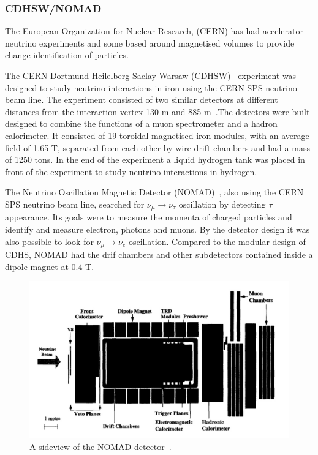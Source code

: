 \subsubsection{CDHSW/NOMAD}
The European Organization for Nuclear Research, (CERN) has had accelerator neutrino experiments and some based around magnetised volumes to provide change identification of particles. 

The CERN Dortmund Heilelberg Saclay Warsaw (CDHSW)~\cite{40CDHSW} experiment was designed to study neutrino interactions in iron using the CERN SPS neutrino beam line. The experiment consisted of two similar detectors at different distances from the interaction vertex 130 m and 885 m~\cite{40CDHSW}.The detectors were built designed to combine the functions of a muon spectrometer and a hadron calorimeter. It consisted of 19 toroidal magnetised iron modules, with an average field of 1.65 T, separated from each other by wire drift chambers and had a mass of 1250 tons. In the end of the experiment a liquid hydrogen tank was placed in front of the experiment to study neutrino interactions in hydrogen.


The Neutrino Oscillation Magnetic Detector (NOMAD)~\cite{NOMADexp}, also using the CERN SPS neutrino beam line, searched for $\nu_\mu \rightarrow \nu_\tau$ oscillation by detecting $\tau$ appearance. Its goals were to measure the momenta of charged particles and identify and measure electron, photons and muons. By the detector design it was also possible to look for $\nu_\mu \rightarrow \nu_e$ oscillation. Compared to the modular design of CDHS, NOMAD had the drif chambers and other subdetectors contained inside a dipole magnet at 0.4 T.


\begin{figure}[h!]
\centering
  \centering
\includegraphics[width=\textwidth]{figures/NOMAD.jpeg}
\vspace{2mm}
\caption{A sideview of the NOMAD detector~\cite{NOMADexp}.}
\label{fig:NOMAD}
\end{figure}



